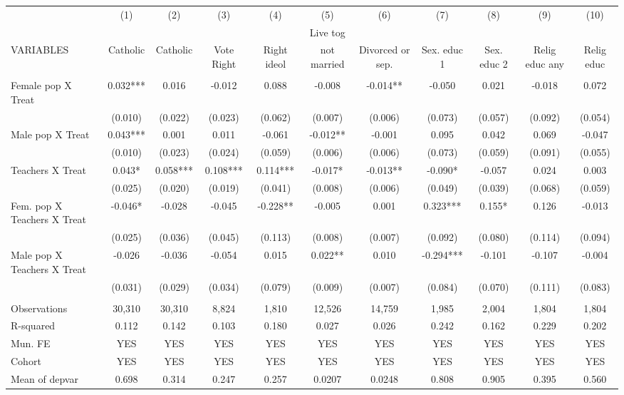 \begin{tabular}{lcccccccccc} \hline
 & (1) & (2) & (3) & (4) & (5) & (6) & (7) & (8) & (9) & (10) \\
 &  &  &  &  & Live tog &  &  &  &  &  \\
VARIABLES & Catholic & Catholic & Vote Right & Right ideol & not married & Divorced or sep. & Sex. educ 1 & Sex. educ 2 & Relig educ any & Relig educ \\ \hline
 &  &  &  &  &  &  &  &  &  &  \\
Female pop X Treat & 0.032*** & 0.016 & -0.012 & 0.088 & -0.008 & -0.014** & -0.050 & 0.021 & -0.018 & 0.072 \\
 & (0.010) & (0.022) & (0.023) & (0.062) & (0.007) & (0.006) & (0.073) & (0.057) & (0.092) & (0.054) \\
Male pop X Treat & 0.043*** & 0.001 & 0.011 & -0.061 & -0.012** & -0.001 & 0.095 & 0.042 & 0.069 & -0.047 \\
 & (0.010) & (0.023) & (0.024) & (0.059) & (0.006) & (0.006) & (0.073) & (0.059) & (0.091) & (0.055) \\
Teachers X Treat & 0.043* & 0.058*** & 0.108*** & 0.114*** & -0.017* & -0.013** & -0.090* & -0.057 & 0.024 & 0.003 \\
 & (0.025) & (0.020) & (0.019) & (0.041) & (0.008) & (0.006) & (0.049) & (0.039) & (0.068) & (0.059) \\
Fem. pop X Teachers X Treat & -0.046* & -0.028 & -0.045 & -0.228** & -0.005 & 0.001 & 0.323*** & 0.155* & 0.126 & -0.013 \\
 & (0.025) & (0.036) & (0.045) & (0.113) & (0.008) & (0.007) & (0.092) & (0.080) & (0.114) & (0.094) \\
Male pop X Teachers X Treat & -0.026 & -0.036 & -0.054 & 0.015 & 0.022** & 0.010 & -0.294*** & -0.101 & -0.107 & -0.004 \\
 & (0.031) & (0.029) & (0.034) & (0.079) & (0.009) & (0.007) & (0.084) & (0.070) & (0.111) & (0.083) \\
 &  &  &  &  &  &  &  &  &  &  \\
Observations & 30,310 & 30,310 & 8,824 & 1,810 & 12,526 & 14,759 & 1,985 & 2,004 & 1,804 & 1,804 \\
R-squared & 0.112 & 0.142 & 0.103 & 0.180 & 0.027 & 0.026 & 0.242 & 0.162 & 0.229 & 0.202 \\
Mun. FE & YES & YES & YES & YES & YES & YES & YES & YES & YES & YES \\
Cohort & YES & YES & YES & YES & YES & YES & YES & YES & YES & YES \\
 Mean of depvar & 0.698 & 0.314 & 0.247 & 0.257 & 0.0207 & 0.0248 & 0.808 & 0.905 & 0.395 & 0.560 \\ \hline
\end{tabular}

